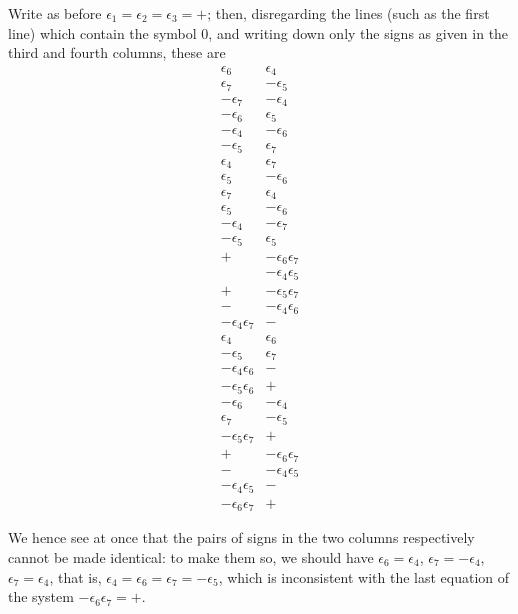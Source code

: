 \documentclass[11pt,a4paper]{article}
\begin{document}
\newpage
\noindent
Write as before $\epsilon_{1}=\epsilon_{2}=\epsilon_{3}=+$; then,
disregarding the lines (such as the first line) which contain the
symbol $0$, and writing down only the signs as given in the third and
fourth columns, these are
\[
  \begin{array}{cc}
    \epsilon_{6} & \epsilon_{4} \\
    \epsilon_{7} & -\epsilon_{5} \\
    -\epsilon_{7} & -\epsilon_{4} \\
    -\epsilon_{6} & \epsilon_{5} \\
    -\epsilon_{4} & -\epsilon_{6} \\
    -\epsilon_{5} & \epsilon_{7} \\
    \epsilon_{4} & \epsilon_{7} \\
    \epsilon_{5} & -\epsilon_{6} \\
    \epsilon_{7} & \epsilon_{4} \\
    \epsilon_{5} & -\epsilon_{6} \\
    -\epsilon_{4} & -\epsilon_{7} \\
    -\epsilon_{5} & \epsilon_{5} \\
    + & -\epsilon_{6}\epsilon_{7} \\
       & -\epsilon_{4}\epsilon_{5} \\
    + & -\epsilon_{5}\epsilon_{7} \\
    - & -\epsilon_{4}\epsilon_{6} \\
    -\epsilon_{4}\epsilon_{7} & - \\
    \epsilon_{4} & \epsilon_{6} \\
    -\epsilon_{5} & \epsilon_{7} \\
    -\epsilon_{4}\epsilon_{6} & - \\
    -\epsilon_{5}\epsilon_{6} & + \\
    -\epsilon_{6} & -\epsilon_{4} \\
    \epsilon_{7} & -\epsilon_{5} \\
    -\epsilon_{5}\epsilon_{7} & + \\
    + & -\epsilon_{6}\epsilon_{7} \\
    - & -\epsilon_{4}\epsilon_{5} \\
    -\epsilon_{4}\epsilon_{5} & - \\
    -\epsilon_{6}\epsilon_{7} & +
  \end{array}
\]

We hence see at once that the pairs of signs in the two columns
respectively cannot be made identical: to make them so, we should have
$\epsilon_{6}=\epsilon_{4}$, $\epsilon_{7}=-\epsilon_{4}$,
$\epsilon_{7}=\epsilon_{4}$, that is,
$\epsilon_{4}=\epsilon_{6}=\epsilon_{7}=-\epsilon_{5}$, which is
inconsistent with the last equation of the system
$-\epsilon_{6}\epsilon_{7}=+$.
\end{document}
